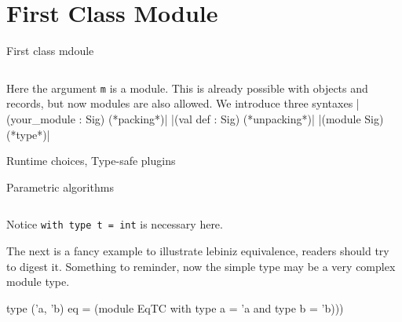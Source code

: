 \section{First Class Module}

First class mdoule 


\inputminted[fontsize=\scriptsize, ]{ocaml}{lang/code/module/intro.ml}

 
Here the argument \verb|m| is a module. This is already possible with
objects and records, but now modules are also allowed.
We introduce three syntaxes 
|(your_module : Sig) (*packing*)|
|(val def : Sig) (*unpacking*)|
|(module Sig) (*type*)|

Runtime choices, Type-safe plugins

Parametric algorithms
\inputminted[fontsize=\scriptsize, fontsize=\scriptsize, ]{ocaml}{lang/code/param.ml}

Notice \verb|with type t = int| is necessary here.

The next is a fancy example to illustrate lebiniz equivalence, readers
should try to digest it. Something to reminder, now the simple type
may be a very complex module type.
\begin{ocamlcode}
type ('a, 'b) eq = (module EqTC with type a = 'a and type b = 'b)))
\end{ocamlcode}


\inputminted[fontsize=\scriptsize, fontsize=\scriptsize, ]{ocaml}{lang/code/module/leibniz.ml}


